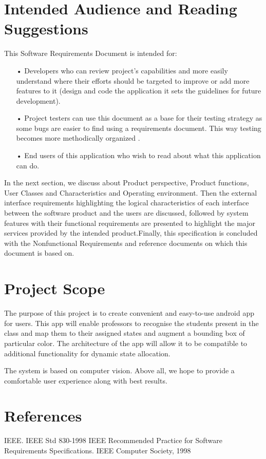 \documentclass{scrreprt}
\begin{document}
\section{Intended Audience and Reading Suggestions}
This Software Requirements Document is intended for:

\begin{itemize}
\item[•] Developers who can review project’s capabilities and 
more easily understand where their efforts should be targeted to improve or add more features to it (design and code the application it sets the guidelines for future development).

\item[•] Project testers can use this document as a base for their 
testing strategy as some bugs are easier to find using a 
requirements document. This way testing becomes more methodically organized
.
\item[•] End users of this application who wish to read about 
what this application can do.
\end{itemize}

In the next section, we discuss about Product perspective, Product functions, User Classes and Characteristics and Operating environment. Then the external interface requirements highlighting the logical characteristics of each interface between the software product and the users are discussed, followed by system features with their functional requirements are presented to highlight the major services provided by the intended product.Finally, this specification is concluded with the Nonfunctional Requirements and reference documents on which this document is based on. 


\section{Project Scope}
The purpose of this project is to create convenient and easy-to-use android app
for users. This app will enable professors to recognise the students present in the class and map them to their assigned states and augment a bounding box of particular color. The architecture of the app will allow
it to be compatible to additional functionality for dynamic state allocation.


The system is based on computer vision. Above all, we
hope to provide a comfortable user experience along with best results.

\section{References}
IEEE. IEEE Std 830-1998 IEEE Recommended Practice for Software Requirements
Specifications. IEEE Computer Society, 1998
\end{document}
